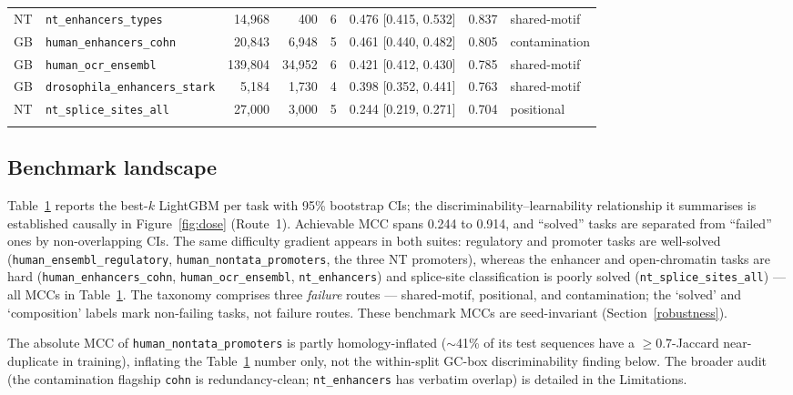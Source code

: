\documentclass{ws-procs11x85}
\begin{document}
\begin{table}[htbp]
{\begin{tabular}{@{}llrrclcl@{}}
NT & \texttt{nt\_enhancers\_types} & 14{,}968 & 400 & 6 & 0.476 [0.415, 0.532] & 0.837 & shared-motif\\
GB & \texttt{human\_enhancers\_cohn} & 20{,}843 & 6{,}948 & 5 & 0.461 [0.440, 0.482] & 0.805 & contamination\\
GB & \texttt{human\_ocr\_ensembl} & 139{,}804 & 34{,}952 & 6 & 0.421 [0.412, 0.430] & 0.785 & shared-motif\\
GB & \texttt{drosophila\_enhancers\_stark} & 5{,}184 & 1{,}730 & 4 & 0.398 [0.352, 0.441] & 0.763 & shared-motif\\
NT & \texttt{nt\_splice\_sites\_all} & 27{,}000 & 3{,}000 & 5 & 0.244 [0.219, 0.271] & 0.704 & positional\\
\botrule
\end{tabular}}
\label{tab:land}
\end{table}

\subsection{Benchmark landscape}\label{benchmark-landscape}

Table~\ref{tab:land} reports the best-$k$ LightGBM per task with 95\% bootstrap CIs; the
discriminability--learnability relationship it summarises is established causally in
Figure~\ref{fig:dose} (Route~1). Achievable MCC spans 0.244 to 0.914, and ``solved'' tasks are separated
from ``failed'' ones by non-overlapping CIs. The same difficulty gradient appears in both suites:
regulatory and promoter tasks are well-solved (\texttt{human\_ensembl\_regulatory},
\texttt{human\_nontata\_promoters}, the three NT promoters), whereas the enhancer and open-chromatin tasks
are hard (\texttt{human\_enhancers\_cohn}, \texttt{human\_ocr\_ensembl}, \texttt{nt\_enhancers}) and
splice-site classification is poorly solved (\texttt{nt\_splice\_sites\_all}) --- all MCCs in
Table~\ref{tab:land}. The taxonomy comprises three \emph{failure} routes --- shared-motif, positional, and
contamination; the `solved' and `composition' labels mark non-failing tasks, not failure routes. These benchmark MCCs are seed-invariant
(Section~\ref{robustness}).

The absolute MCC of \texttt{human\_nontata\_promoters} is partly homology-inflated ($\sim$41\% of its test
sequences have a $\ge$0.7-Jaccard near-duplicate in training), inflating the Table~\ref{tab:land} number
only, not the within-split GC-box discriminability finding below. The broader audit (the contamination
flagship \texttt{cohn} is redundancy-clean; \texttt{nt\_enhancers} has verbatim overlap) is detailed in the
Limitations.
\end{document}
